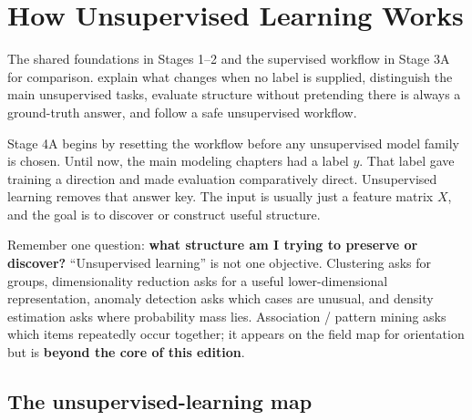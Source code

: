\chapter{How Unsupervised Learning Works}
\label{ch:unsupervised}

\chapterguide%
  {The shared foundations in Stages 1--2 and the supervised workflow in Stage 3A for comparison.}
  {explain what changes when no label is supplied, distinguish the main unsupervised tasks, evaluate structure without pretending there is always a ground-truth answer, and follow a safe unsupervised workflow.}

Stage 4A begins by resetting the workflow before any unsupervised model family is chosen. Until now, the main modeling chapters had a label $y$. That label gave training a direction and made evaluation comparatively direct. Unsupervised learning removes that answer key. The input is usually just a feature matrix $X$, and the goal is to discover or construct useful structure.

\begin{mlfigure}
\end{mlfigure}

\begin{firstread}
Remember one question: \textbf{what structure am I trying to preserve or discover?} ``Unsupervised learning'' is not one objective. Clustering asks for groups, dimensionality reduction asks for a useful lower-dimensional representation, anomaly detection asks which cases are unusual, and density estimation asks where probability mass lies. Association / pattern mining asks which items repeatedly occur together; it appears on the field map for orientation but is \textbf{beyond the core of this edition}.
\end{firstread}

\section{The unsupervised-learning map}


